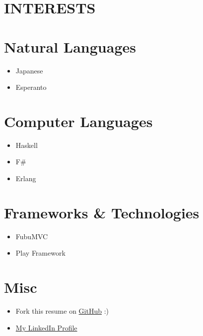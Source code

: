 \documentclass[margin]{res}
\begin{document}
\begin{resume}
\section {INTERESTS}
	\normalsize{\section{Natural Languages}}
		\begin{itemize}
			\item Japanese
			\item Esperanto
		\end{itemize}
	\normalsize{\section{Computer Languages}}
		\begin{itemize}
			\item Haskell
			\item F\#
			\item Erlang
		\end{itemize}
	\normalsize{\section{Frameworks \& Technologies}}
		\begin{itemize}
			\item FubuMVC
			\item Play Framework
		\end{itemize}
	\section{Misc}
		\begin{itemize}
			\item Fork this resume on \href{https://github.com/vsviridov/resume}{GitHub} :)
			\item \href{http://ca.linkedin.com/in/vasilisviridov/}{My LinkedIn Profile}
		\end{itemize}
\end{resume}
\end{document}
